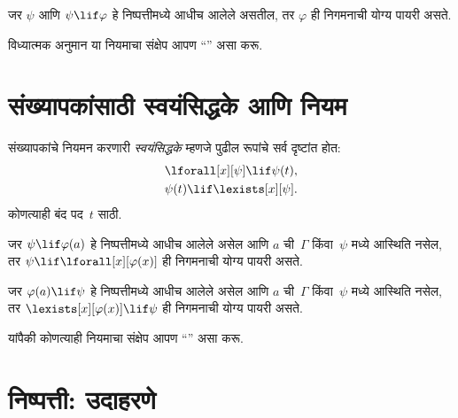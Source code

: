\begin{defn}[विध्यात्मक अनुमान]
  जर $\psi$ आणि $\psi \lif \varphi$ हे निष्पत्तीमध्ये आधीच आलेले असतील,
  तर $\varphi$ ही निगमनाची योग्य पायरी असते.
\end{defn}

विध्यात्मक अनुमान या नियमाचा संक्षेप आपण ``\MP'' असा करू.












\section{संख्यापकांसाठी स्वयंसिद्धके आणि नियम}\label{fol:axd:qua:sec}

\begin{defn}[संख्यापकांसाठी स्वयंसिद्धके]
संख्यापकांचे नियमन करणारी \emph{स्वयंसिद्धके} म्हणजे पुढील रूपांचे सर्व
दृष्टांत होत:
\begin{align}
\label{fol:axd:qua:ax:q1} & \lforall[x][\psi] \lif \psi(t), \\
\label{fol:axd:qua:ax:q2} & \psi(t) \lif \lexists[x][\psi].
\end{align}
कोणत्याही बंद पद~$t$ साठी.
\end{defn}

\begin{defn}[संख्यापकांसाठी नियम]
\item जर $\psi \lif \varphi(a)$ हे निष्पत्तीमध्ये आधीच आलेले असेल आणि
  $a$ ची~$\Gamma$ किंवा~$\psi$ मध्ये आस्थिति नसेल, तर $\psi \lif
  \lforall[x][\varphi(x)]$ ही निगमनाची योग्य पायरी असते.
\item जर $\varphi(a) \lif \psi$ हे निष्पत्तीमध्ये आधीच आलेले असेल आणि
  $a$ ची~$\Gamma$ किंवा~$\psi$ मध्ये आस्थिति नसेल, तर
  $\lexists[x][\varphi(x)] \lif \psi$ ही निगमनाची योग्य पायरी असते.
\end{defn}

यांपैकी कोणत्याही नियमाचा संक्षेप आपण ``\QR'' असा करू.












\section{निष्पत्ती: उदाहरणे}\label{fol:axd:pro:sec}


